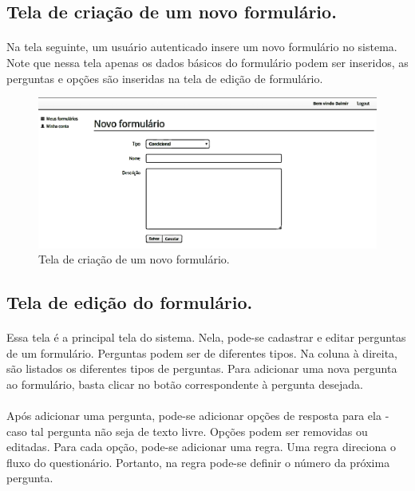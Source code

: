 \documentclass[11pt]{article}
\begin{document}
    \subsection{Tela de criação de um novo formulário.}
    
    \paragraph{}

    Na tela seguinte, um usuário autenticado insere um novo formulário no
    sistema. Note que nessa tela apenas os dados básicos do formulário 
    podem ser inseridos, as perguntas e opções são inseridas na tela de 
    edição de formulário.
        
    \begin{figure}[h!]
      \centering
      \includegraphics[width=.9\textwidth]{new_form.png}
      \caption{Tela de criação de um novo formulário.}
    \end{figure}
        
  \clearpage
    
    \subsection{Tela de edição do formulário.}
    
    \paragraph{}
    Essa tela é a principal tela do sistema. Nela, pode-se cadastrar e
    editar perguntas de um formulário. Perguntas podem ser de diferentes
    tipos. Na coluna à direita, são listados os diferentes tipos de 
    perguntas. Para adicionar uma nova pergunta ao formulário, basta clicar
    no botão correspondente à pergunta desejada.
    
    \paragraph{}
    Após adicionar uma pergunta, pode-se adicionar opções de resposta
    para ela - caso tal pergunta não seja de texto livre. Opções podem 
    ser removidas ou editadas. Para cada opção, pode-se adicionar uma 
    regra. Uma regra direciona o fluxo do questionário. Portanto, na regra
    pode-se definir o  número da próxima pergunta.
        
\end{document}
